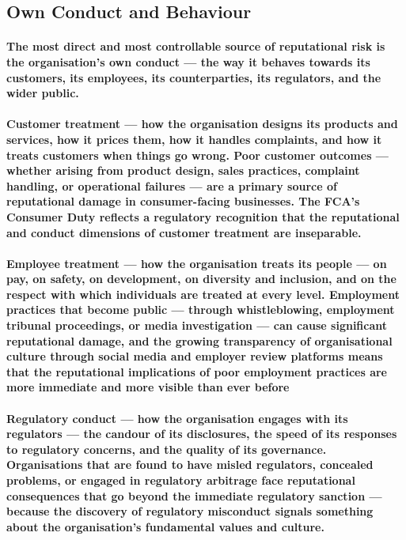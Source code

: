 \subsection{Own Conduct and Behaviour}
\paragraph{The most direct and most controllable source of reputational risk is the organisation's own conduct — the way it behaves towards its customers, its employees, its counterparties, its regulators, and the wider public.}
\paragraph{\textbf{Customer treatment} — how the organisation designs its products and services, how it prices them, how it handles complaints, and how it treats customers when things go wrong. Poor customer outcomes — whether arising from product design, sales practices, complaint handling, or operational failures — are a primary source of reputational damage in consumer-facing businesses. The FCA's Consumer Duty reflects a regulatory recognition that the reputational and conduct dimensions of customer treatment are inseparable.}
\paragraph{\textbf{Employee treatment} — how the organisation treats its people — on pay, on safety, on development, on diversity and inclusion, and on the respect with which individuals are treated at every level. Employment practices that become public — through whistleblowing, employment tribunal proceedings, or media investigation — can cause significant reputational damage, and the growing transparency of organisational culture through social media and employer review platforms means that the reputational implications of poor employment practices are more immediate and more visible than ever before}
\paragraph{\textbf{Regulatory conduct} — how the organisation engages with its regulators — the candour of its disclosures, the speed of its responses to regulatory concerns, and the quality of its governance. Organisations that are found to have misled regulators, concealed problems, or engaged in regulatory arbitrage face reputational consequences that go beyond the immediate regulatory sanction — because the discovery of regulatory misconduct signals something about the organisation's fundamental values and culture.}
